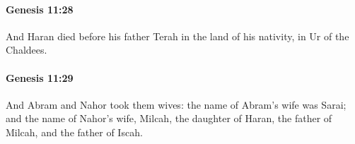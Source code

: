 		\paragraph{Genesis 11:28} %
			\label{GENESIS-11-28}

			And Haran died before his father Terah in the land of his nativity, in Ur of the Chaldees.


		\paragraph{Genesis 11:29} %
			\label{GENESIS-11-29}

			And Abram and Nahor took them wives: the name of Abram's wife was Sarai; and the name of Nahor's wife, Milcah, the daughter of Haran, the father of Milcah, and the father of Iscah.


